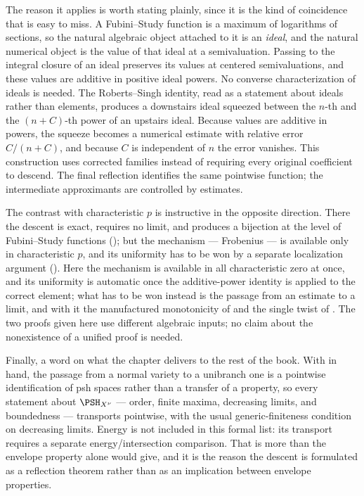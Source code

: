 The reason it applies is worth stating plainly, since it is the kind of
coincidence that is easy to miss.  A Fubini--Study function is a maximum of
logarithms of sections, so the natural algebraic object attached to it is an
\emph{ideal}, and the natural numerical object is the value of that ideal at
a semivaluation.  Passing to the integral closure of an ideal preserves its values at
centered semivaluations, and these values are additive in positive
ideal powers.  No converse characterization of ideals is needed.  The
Roberts--Singh identity, read as a statement about ideals rather than
elements, produces a downstairs ideal squeezed between the $n$-th and the
$(n+C)$-th power of an upstairs ideal.  Because values are additive in
powers, the squeeze becomes a numerical estimate with relative error
$C/(n+C)$, and because $C$ is independent of $n$ the error vanishes.
This construction uses corrected families instead of requiring every
original coefficient to descend.  The final reflection identifies the
same pointwise function; the intermediate approximants are controlled
by estimates.

The contrast with characteristic $p$ is instructive in the opposite
direction.  There the descent is exact, requires no limit, and produces a
bijection at the level of Fubini--Study functions
(); but the mechanism --- Frobenius --- is
available only in characteristic $p$, and its uniformity has to be won by
a separate localization argument
().  Here the mechanism is available in
all characteristic zero at once, and its uniformity is automatic once the
additive-power identity is applied to the correct element; what has to be
won instead is the passage from an estimate to a limit, and with it the
manufactured monotonicity of  and the single
twist of .  The two proofs given here use different algebraic inputs; no claim
about the nonexistence of a unified proof is needed.

Finally, a word on what the chapter delivers to the rest of the book.  With
 in hand, the passage
from a normal variety to a unibranch one is a pointwise identification of
psh spaces rather than a transfer of a property, so every statement about
$\PSH_{X^\nu}$ --- order, finite maxima, decreasing limits, and
boundedness --- transports pointwise, with the usual generic-finiteness
condition on decreasing limits.  Energy is not included in this formal
list: its transport requires a separate energy/intersection comparison.
That is more
than the envelope property alone would give, and it is the reason the
descent is formulated as a reflection theorem rather than as an implication
between envelope properties.
